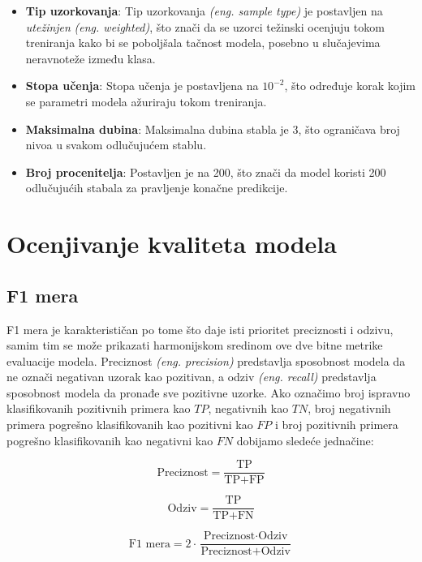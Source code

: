 \documentclass{article}
\begin{document}
\begin{itemize}
    \item \textbf{Tip uzorkovanja}: Tip uzorkovanja \textit{(eng. sample type)} je postavljen na \textit{utežinjen} \textit{(eng. weighted)}, 
    što znači da se uzorci težinski ocenjuju tokom treniranja kako bi se poboljšala tačnost modela, posebno u slučajevima neravnoteže između klasa.
    \item \textbf{Stopa učenja}: Stopa učenja je postavljena na $10^{-2}$, što određuje korak kojim se parametri modela ažuriraju tokom treniranja.
    \item \textbf{Maksimalna dubina}: Maksimalna dubina stabla je 3, što ograničava broj nivoa u svakom odlučujućem stablu.
    \item \textbf{Broj procenitelja}: Postavljen je na 200, što znači da model koristi 200 odlučujućih stabala za pravljenje konačne predikcije. 
\end{itemize}

\section{Ocenjivanje kvaliteta modela}
\subsection{F1 mera}

F1 mera je karakterističan po tome što daje isti prioritet preciznosti i odzivu, samim tim se može prikazati harmonijskom sredinom ove dve bitne metrike evaluacije modela.
\newline
Preciznost \textit{(eng. precision)} predstavlja sposobnost modela da ne označi negativan uzorak kao pozitivan, a odziv \textit{(eng. recall)} predstavlja sposobnost modela da pronađe sve pozitivne uzorke. Ako označimo broj ispravno klasifikovanih pozitivnih primera kao $TP$, negativnih kao $TN$, broj negativnih primera pogrešno klasifikovanih kao pozitivni kao $FP$ i broj pozitivnih primera pogrešno klasifikovanih kao negativni kao $FN$ dobijamo sledeće jednačine:

\begin{equation}
\text{Preciznost} = \frac{\text{TP}}{\text{TP} + \text{FP}}
\end{equation}

\begin{equation}
\text{Odziv} = \frac{\text{TP}}{\text{TP} + \text{FN}}
\end{equation}

\begin{equation}
\text{F1 mera} = 2 \cdot \frac{\text{Preciznost} \cdot \text{Odziv}}{\text{Preciznost} + \text{Odziv}}
\end{equation}
\end{document}
